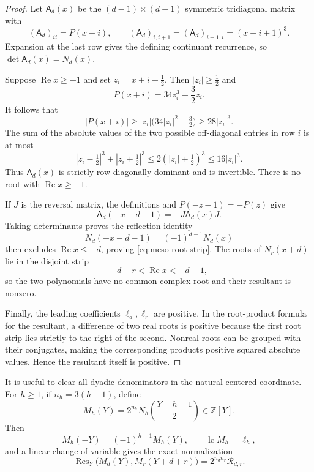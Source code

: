 \begin{proof}
Let $\mathsf A_d(x)$ be the $(d-1)\times(d-1)$ symmetric tridiagonal matrix
with
\[
 (\mathsf A_d)_{ii}=P(x+i),\qquad
 (\mathsf A_d)_{i,i+1}=(\mathsf A_d)_{i+1,i}=(x+i+1)^3.
\]
Expansion at the last row gives the defining continuant recurrence, so
$\det\mathsf A_d(x)=N_d(x)$.

Suppose $\operatorname {Re}x\geq-1$ and set
$z_i=x+i+\tfrac12$.  Then $|z_i|\geq\tfrac12$ and
\[
 P(x+i)=34z_i^3+\frac32z_i.
\]
It follows that
\[
 |P(x+i)|
 \geq |z_i|\bigl(34|z_i|^2-\tfrac32\bigr)
 \geq28|z_i|^3.
\]
The sum of the absolute values of the two possible off-diagonal entries
in row $i$ is at most
\[
 |z_i-\tfrac12|^3+|z_i+\tfrac12|^3
 \leq2(|z_i|+\tfrac12)^3
 \leq16|z_i|^3.
\]
Thus $\mathsf A_d(x)$ is strictly row-diagonally dominant and is invertible.
There is no root with $\operatorname {Re}x\geq-1$.

If $J$ is the reversal matrix, the definitions and
$P(-z-1)=-P(z)$ give
\[
 \mathsf A_d(-x-d-1)=-J\mathsf A_d(x)J.
\]
Taking determinants proves the reflection identity
\[
 N_d(-x-d-1)=(-1)^{d-1}N_d(x)
\]
then excludes $\operatorname {Re}x\leq-d$, proving
\eqref{eq:meso-root-strip}.  The roots of $N_r(x+d)$ lie in the
disjoint strip
\[
 -d-r<\operatorname {Re}x<-d-1,
\]
so the two polynomials have no common complex root and their resultant
is nonzero.

Finally, the leading coefficients $\ell_d,\ell_r$ are positive.  In the
root-product formula for the resultant, a difference of two real roots is
positive because the first root strip lies strictly to the right of the
second.  Nonreal roots can be grouped with their conjugates, making the
corresponding products positive squared absolute values.  Hence the
resultant itself is positive.
\end{proof}

It is useful to clear all dyadic denominators in the natural centered
coordinate.  For $h\geq1$, if $n_h=3(h-1)$, define
\begin{equation}\label{eq:meso-M-def}
 M_h(Y)=2^{n_h}N_h\left(\frac{Y-h-1}{2}\right)\in\mathbb Z[Y].
\end{equation}
Then
\[
 M_h(-Y)=(-1)^{h-1}M_h(Y),\qquad
 \operatorname {lc}M_h=\ell_h,
\]
and a linear change of variable gives the exact normalization
\begin{equation}\label{eq:meso-M-resultant}
 \operatorname {Res}_Y\bigl(M_d(Y),M_r(Y+d+r)\bigr)
 =2^{n_dn_r}\mathcal R_{d,r}.
\end{equation}

